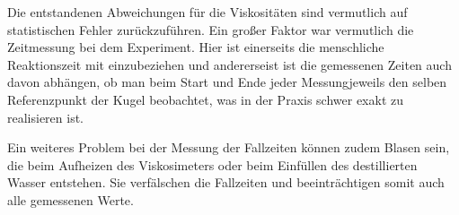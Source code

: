 Die entstandenen Abweichungen für die Viskositäten sind vermutlich auf statistischen
Fehler zurückzuführen. Ein großer Faktor war vermutlich die Zeitmessung bei dem
Experiment. Hier ist einerseits die menschliche Reaktionszeit mit einzubeziehen
und andererseist ist die gemessenen Zeiten auch davon abhängen, ob man beim Start
und Ende jeder Messungjeweils den selben Referenzpunkt der Kugel beobachtet, was
in der Praxis schwer exakt zu realisieren ist.

Ein weiteres Problem bei der Messung der Fallzeiten können zudem Blasen sein, die
beim Aufheizen des Viskosimeters oder beim Einfüllen des destillierten Wasser
entstehen. Sie verfälschen die Fallzeiten und beeinträchtigen somit auch alle
gemessenen Werte.
